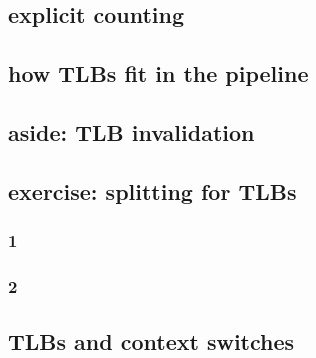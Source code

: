 \subsection{explicit counting}


\subsection{how TLBs fit in the pipeline}


\subsection{aside: TLB invalidation}


\subsection{exercise: splitting for TLBs}
\subsubsection{1}

\subsubsection{2}




\subsection{TLBs and context switches}


